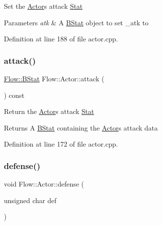 Set the \hyperlink{class_flow_1_1_actor}{Actor}\textquotesingle{}s attack \hyperlink{class_flow_1_1_stat}{Stat} 
\begin{DoxyParams}{Parameters}
{\em atk} & A \hyperlink{class_flow_1_1_b_stat}{B\+Stat} object to set \+\_\+atk to \\
\hline
\end{DoxyParams}


Definition at line 188 of file actor.\+cpp.

\hypertarget{class_flow_1_1_actor_ab1b5a1e970f6721aeefe580e77d24ddb}{}\label{class_flow_1_1_actor_ab1b5a1e970f6721aeefe580e77d24ddb} 
\subsubsection{\texorpdfstring{attack()}{attack()}\hspace{0.1cm}{\footnotesize\ttfamily [3/3]}}
{\footnotesize\ttfamily \hyperlink{class_flow_1_1_b_stat}{Flow\+::\+B\+Stat} Flow\+::\+Actor\+::attack (\begin{DoxyParamCaption}{ }\end{DoxyParamCaption}) const}

Return the \hyperlink{class_flow_1_1_actor}{Actor}\textquotesingle{}s attack \hyperlink{class_flow_1_1_stat}{Stat} \begin{DoxyReturn}{Returns}
A \hyperlink{class_flow_1_1_b_stat}{B\+Stat} containing the \hyperlink{class_flow_1_1_actor}{Actor}\textquotesingle{}s attack data 
\end{DoxyReturn}


Definition at line 172 of file actor.\+cpp.

\hypertarget{class_flow_1_1_actor_a20e4a2e21e5ba583df61b83770a35033}{}\label{class_flow_1_1_actor_a20e4a2e21e5ba583df61b83770a35033} 
\subsubsection{\texorpdfstring{defense()}{defense()}\hspace{0.1cm}{\footnotesize\ttfamily [1/3]}}
{\footnotesize\ttfamily void Flow\+::\+Actor\+::defense (\begin{DoxyParamCaption}\item[{unsigned char}]{def }\end{DoxyParamCaption})}

